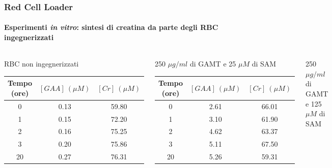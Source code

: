 \begin{frame}[fragile]
\begin{columns}
\begin{figure}
{
	}
\end{figure}

\end{columns}
	
\end{frame}

\begin{frame}
	\frametitle{Red Cell Loader}
	\framesubtitle{Esperimenti \emph{in vitro}: sintesi di creatina da parte degli RBC ingegnerizzati}
	
	\begin{columns}[t]
		\begin{block}{RBC non ingegnerizzati \phantom{aaaaaaaaaaaaaaaaaaaaa}}
			\resizebox{\textwidth}{!} {
				\begin{tabular}{| c | c | c |}
					\hline
					Tempo (ore) & $[GAA]\ (\mu M)$ & $[Cr]\ (\mu M)$ \\
					\hline
					0 & 0.13 & 59.80\\
					\hline
					1 & 0.15 & 72.20\\
					\hline
					2 & 0.16 & 75.25\\
					\hline
					3 & 0.20 & 75.86\\
					\hline
					20 & 0.27 & 76.31\\
					\hline
				\end{tabular}
			}
		\end{block}
		\begin{block}{250 $\mu g/ml$ di GAMT e 25 $\mu M$ di SAM}
			\resizebox{\textwidth}{!} {
				\begin{tabular}{| c | c | c |}
					\hline
					Tempo (ore) & $[GAA]\ (\mu M)$ & $[Cr]\ (\mu M)$ \\
					\hline
					0 & 2.61 & 66.01\\
					\hline
					1 & 3.10 & 61.90\\
					\hline
					2 & 4.62 & 63.37\\
					\hline
					3 & 5.11 & 67.50\\
					\hline
					20 & 5.26 & 59.31\\
					\hline
				\end{tabular}
			}
		\end{block}
		\begin{block}{250 $\mu g/ml$ di GAMT e 125 $\mu M$ di SAM}

\end{block}
\end{columns}
\end{frame}
